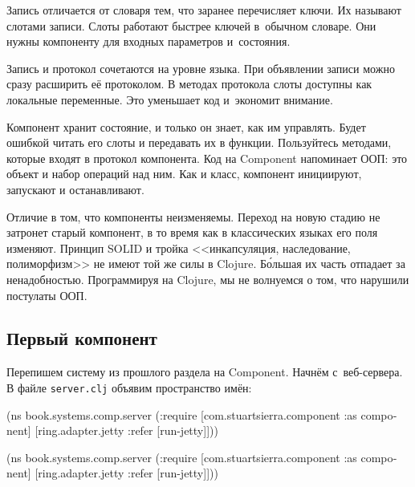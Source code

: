 
Запись отличается от словаря тем, что заранее перечисляет ключи. Их называют
слотами записи. Слоты работают быстрее ключей в~обычном словаре. Они нужны
компоненту для входных параметров и~состояния.

Запись и протокол сочетаются на уровне языка. При объявлении записи можно сразу
расширить её протоколом. В методах протокола слоты доступны как локальные
переменные. Это уменьшает код и~экономит внимание.


Компонент хранит состояние, и только он знает, как им управлять. Будет ошибкой
читать его слоты и передавать их в функции. Пользуйтесь методами, которые входят
в протокол компонента. Код на Component напоминает ООП: это объект и набор
операций над ним. Как и класс, компонент инициируют, запускают и останавливают.


Отличие в том, что компоненты неизменяемы. Переход на новую стадию не затронет
старый компонент, в то время как в классических языках его поля
изменяют. Принцип SOLID и тройка <<инкапсуляция, наследование, полиморфизм>> не
имеют той же силы в Clojure. Б\'{о}льшая их часть отпадает за
ненадобностью. Программируя на Clojure, мы не волнуемся о том, что нарушили
постулаты ООП.

\subsection{Первый компонент}

Перепишем систему из прошлого раздела на Component. Начнём с~веб-сервера. В
файле \verb|server.clj| объявим пространство имён:

\ifx\DEVICETYPE\MOBILE

\begin{english}
  \begin{clojure}
(ns book.systems.comp.server
  (:require
   [com.stuartsierra.component
    :as component]
   [ring.adapter.jetty
    :refer [run-jetty]]))
  \end{clojure}
\end{english}

\else

\begin{english}
  \begin{clojure}
(ns book.systems.comp.server
  (:require
   [com.stuartsierra.component :as component]
   [ring.adapter.jetty :refer [run-jetty]]))
  \end{clojure}
\end{english}

